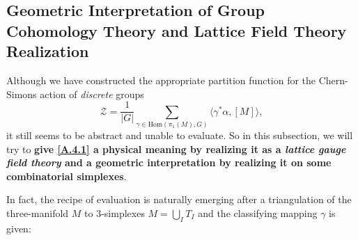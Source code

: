 \documentclass[10pt,nofootinbib,letterpaper]{revtex4}
\def\Z{\mathcal{Z}}
\begin{document}
	\subsection{Geometric Interpretation of Group Cohomology Theory and Lattice Field Theory Realization}
		Although we have constructed the appropriate partition function for the Chern-Simons action of \emph{discrete} groups
		\begin{equation}\label{A.4.1}
			\Z=\dfrac{1}{|G|}\sum_{\gamma\in\mathrm{Hom}(\pi_1(M),G)}\langle\gamma^* \alpha,[M]\rangle,
		\end{equation}
		it still seems to be abstract and unable to evaluate. So in this subsection, we will try to \textbf{give \eqref{A.4.1} a physical meaning by realizing it as a \emph{lattice gauge field theory} and a geometric interpretation by realizing it on some combinatorial simplexes}.\par
		In fact, the recipe of evaluation is naturally emerging after a triangulation of the three-manifold $M$ to $3$-simplexes $M=\bigcup_I T_I$ and the classifying mapping $\gamma$ is given:
\end{document}
